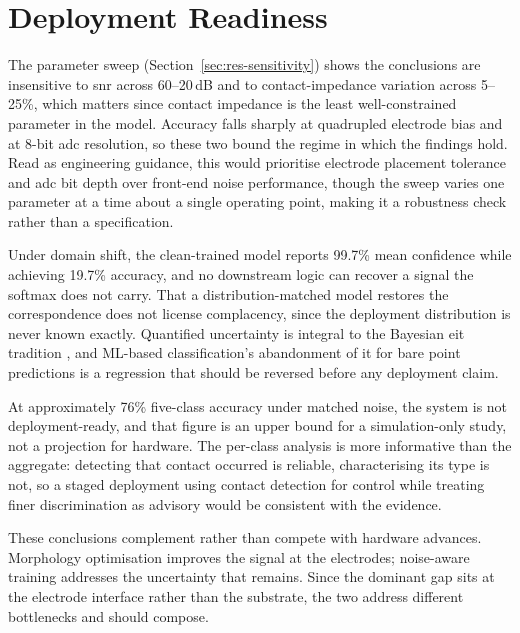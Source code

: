 \section{Deployment Readiness}
\label{sec:disc-deployment}

The parameter sweep (Section~\ref{sec:res-sensitivity}) shows the conclusions are insensitive to \gls{snr} across 60--20\,dB and to contact-impedance variation across 5--25\%, which matters since contact impedance is the least well-constrained parameter in the model. Accuracy falls sharply at quadrupled electrode bias and at 8-bit \gls{adc} resolution, so these two bound the regime in which the findings hold. Read as engineering guidance, this would prioritise electrode placement tolerance and \gls{adc} bit depth over front-end noise performance, though the sweep varies one parameter at a time about a single operating point, making it a robustness check rather than a specification.

Under domain shift, the clean-trained model reports 99.7\% mean confidence while achieving 19.7\% accuracy, and no downstream logic can recover a signal the softmax does not carry. That a distribution-matched model restores the correspondence does not license complacency, since the deployment distribution is never known exactly. Quantified uncertainty is integral to the Bayesian \gls{eit} tradition \parencite{kaipio2005statistical}, and ML-based classification's abandonment of it for bare point predictions is a regression that should be reversed before any deployment claim.

At approximately 76\% five-class accuracy under matched noise, the system is not deployment-ready, and that figure is an upper bound for a simulation-only study, not a projection for hardware. The per-class analysis is more informative than the aggregate: detecting that contact occurred is reliable, characterising its type is not, so a staged deployment using contact detection for control while treating finer discrimination as advisory would be consistent with the evidence.

These conclusions complement rather than compete with hardware advances. Morphology optimisation \parencite{dong2025lattice} improves the signal at the electrodes; noise-aware training addresses the uncertainty that remains. Since the dominant gap sits at the electrode interface rather than the substrate, the two address different bottlenecks and should compose.

